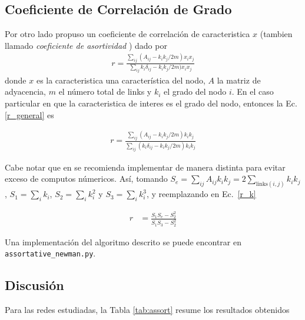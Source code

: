 \subsection{Coeficiente de Correlaci\'on de Grado}
Por otro lado \citet{newman,newman2003} propuso un coeficiente de correlaci\'on de caracteristica $x$ (tambien llamado 
\textit{coeficiente de asortividad} ) dado por
\begin{align}
    r = \frac{\sum_{ij} \left( A_{ij} - k_i k_j/2m\right) x_i x_j}{\sum_{ij}k_i \delta_{ij} - k_i k_j/2m)x_i x_j}
    \label{r_general}
\end{align}
donde $x$ es la caracteristica una caracter\'istica del nodo, $A$ la matriz de adyacencia, $m$ el n\'umero total de links y $k_i$ el grado del nodo $i$. En el caso particular en que la caracteristica de interes es el grado del nodo, 
entonces la Ec. \ref{r_general} es

\begin{align}
    r = \frac{\sum_{ij} \left( A_{ij} - k_i k_j/2m\right) k_i k_j}{\sum_{ij}(k_i \delta_{ij} - k_i k_j/2m)k_i k_j}
    \label{r_k}
\end{align}

Cabe notar que en \citet{newman} se recomienda implementar de manera distinta para evitar exceso de computos n\'umericos. As\'i, 
tomando $  S_e = \sum_{ij} A_{ij} k_i k_j = 2\sum_{\text{links}(i,j)} k_i k_j $, 
$ S_1 = \sum_i k_i $, $ S_2 = \sum_i k_i^2 $ y $ S_3 = \sum_i k_i^3 $, y reemplazando en Ec.~\ref{r_k}

\begin{align}
    r &= \frac{S_1S_e - S_2^2}{S_1S_3 - S_2^2}
\end{align}

Una implementaci\'on del algoritmo descrito se puede encontrar en \texttt{assortative\_newman.py}. 

\subsection{Discusi\'on}

Para las redes estudiadas, la Tabla \ref{tab:assort} resume los resultados obtenidos 

